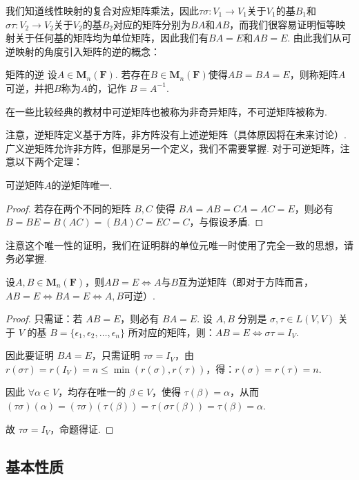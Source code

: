 我们知道线性映射的复合对应矩阵乘法，因此$\tau\sigma:V_1\to V_1$关于$V_1$的基$B_1$和$\sigma\tau:V_2\to V_2$关于$V_2$的基$B_2$对应的矩阵分别为$BA$和$AB$，而我们很容易证明恒等映射关于任何基的矩阵均为单位矩阵，因此我们有$BA=E$和$AB=E$. 由此我们从可逆映射的角度引入矩阵的逆的概念：
\begin{definition}{矩阵的逆}{}
    设$A \in \mathbf{M}_n(\mathbf{F})$. 若存在$B \in \mathbf{M}_n(\mathbf{F})$使得$AB=BA=E$，则称矩阵$A$可逆，并把$B$称为$A$的，记作 $ B = A^{-1} $.
\end{definition}
在一些比较经典的教材中可逆矩阵也被称为非奇异矩阵，不可逆矩阵被称为.

注意，逆矩阵定义基于方阵，非方阵没有上述逆矩阵（具体原因将在未来讨论）. 广义逆矩阵允许非方阵，但那是另一个定义，我们不需要掌握. 对于可逆矩阵，注意以下两个定理：
\begin{theorem}{}{}
    可逆矩阵$A$的逆矩阵唯一.
\end{theorem}

\begin{proof}
    若存在两个不同的矩阵 $B,C$ 使得 $BA=AB=CA=AC=E$，则必有 $B=BE=B(AC)=(BA)C=EC=C$，与假设矛盾.
\end{proof}
注意这个唯一性的证明，我们在证明群的单位元唯一时使用了完全一致的思想，请务必掌握.

\begin{theorem}{}{}
    设$A,B\in \mathbf{M}_n(\mathbf{F})$，则$AB=E \iff A$与$B$互为逆矩阵（即对于方阵而言，$AB=E\iff BA=E\iff A,B$可逆）.
\end{theorem}

\begin{proof}
    只需证：若 $AB=E$，则必有 $BA=E$.
    设 $A,B$ 分别是 $\sigma, \tau \in L(V,V)$ 关于 $V$ 的基 $B=\{\epsilon_1,\epsilon_2,\ldots,\epsilon_n\}$ 所对应的矩阵，则：$AB=E \iff \sigma\tau = I_V$.

    因此要证明 $BA=E$，只需证明 $\tau\sigma=I_V$，由 $r(\sigma\tau)=r(I_V)=n \leqslant \min(r(\sigma),r(\tau))$，得：$r(\sigma)=r(\tau)=n$.

    因此 $\forall \alpha \in V$，均存在唯一的 $\beta \in V$，使得 $\tau(\beta)=\alpha$，从而 $(\tau\sigma)(\alpha)=(\tau\sigma)(\tau(\beta))=\tau(\sigma\tau(\beta))=\tau(\beta)=\alpha$.

    故 $\tau\sigma=I_V$，命题得证.
\end{proof}

\subsection{基本性质}

